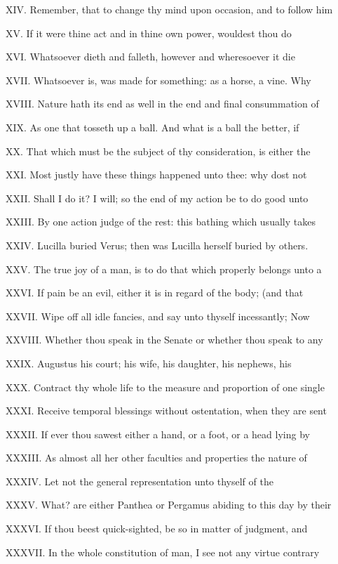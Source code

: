 XIV. Remember, that to change thy mind upon
occasion, and to follow him

XV. If it were thine act and in thine own
power, wouldest thou do

XVI. Whatsoever dieth and falleth, however and
wheresoever it die

XVII. Whatsoever is, was made for something:
as a horse, a vine. Why

XVIII. Nature hath its end as well in the end
and final consummation of

XIX. As one that tosseth up a ball. And what
is a ball the better, if

XX. That which must be the subject of thy
consideration, is either the

XXI. Most justly have these things happened
unto thee: why dost not

XXII. Shall I do it? I will; so the end of my
action be to do good unto

XXIII. By one action judge of the rest: this
bathing which usually takes

XXIV. Lucilla buried Verus; then was Lucilla
herself buried by others.

XXV. The true joy of a man, is to do that
which properly belongs unto a

XXVI. If pain be an evil, either it is in
regard of the body; (and that

XXVII. Wipe off all idle fancies, and say unto
thyself incessantly; Now

XXVIII. Whether thou speak in the Senate or
whether thou speak to any

XXIX. Augustus his court; his wife, his
daughter, his nephews, his

XXX. Contract thy whole life to the measure
and proportion of one single

XXXI. Receive temporal blessings without
ostentation, when they are sent

XXXII. If ever thou sawest either a hand, or a
foot, or a head lying by

XXXIII. As almost all her other faculties and
properties the nature of

XXXIV. Let not the general representation unto
thyself of the

XXXV. What? are either Panthea or Pergamus
abiding to this day by their

XXXVI. If thou beest quick-sighted, be so in
matter of judgment, and

XXXVII. In the whole constitution of man, I
see not any virtue contrary

